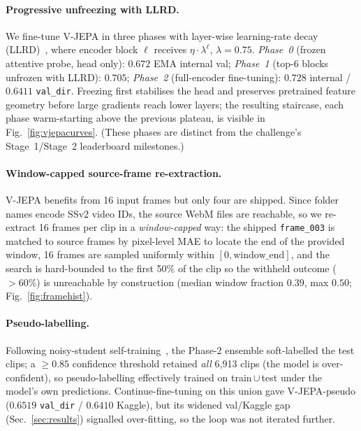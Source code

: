 \documentclass[10pt,twocolumn,letterpaper]{article}
\begin{document}
\paragraph{Progressive unfreezing with LLRD.}
We fine-tune V-JEPA in three phases with layer-wise learning-rate decay
(LLRD)~\cite{howard2018ulmfit,clark2020electra,bao2022beit}, where encoder
block $\ell$ receives $\eta\cdot\lambda^{\ell}$, $\lambda{=}0.75$.
\emph{Phase~0} (frozen attentive probe, head only): $0.672$ EMA internal val;
\emph{Phase~1} (top-6 blocks unfrozen with LLRD): $0.705$;
\emph{Phase~2} (full-encoder fine-tuning): $0.728$ internal /
$0.6411$ \texttt{val\_dir}. Freezing first stabilises the head and preserves
pretrained feature geometry before large gradients reach lower layers; the
resulting staircase, each phase warm-starting above the previous plateau, is
visible in Fig.~\ref{fig:vjepacurves}. (These phases are distinct from the
challenge's Stage~1/Stage~2 leaderboard milestones.)

\paragraph{Window-capped source-frame re-extraction.}
V-JEPA benefits from 16 input frames but only four are shipped. Since folder
names encode SSv2 video IDs, the source WebM files are reachable, so we
re-extract 16 frames per clip in a \emph{window-capped} way: the shipped
\texttt{frame\_003} is matched to source frames by pixel-level MAE to locate
the end of the provided window, 16 frames are sampled uniformly within
$[0,\text{window\_end}]$, and the search is hard-bounded to the first 50\% of
the clip so the withheld outcome ($>60\%$) is unreachable by construction
(median window fraction $0.39$, max $0.50$; Fig.~\ref{fig:framehist}).

\paragraph{Pseudo-labelling.}
Following noisy-student self-training~\cite{xie2020noisystudent,lee2013pseudo},
the Phase-2 ensemble soft-labelled the test clips; a $\geq 0.85$
confidence threshold retained \emph{all} 6{,}913 clips (the model is
over-confident), so pseudo-labelling effectively trained on
train\,$\cup$\,test under the model's own predictions. Continue-fine-tuning
on this union gave V-JEPA-pseudo ($0.6519$ \texttt{val\_dir} / $0.6410$
Kaggle), but its widened val/Kaggle gap (Sec.~\ref{sec:results}) signalled
over-fitting, so the loop was not iterated further.
\end{document}
